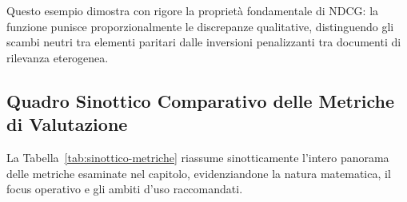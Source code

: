 Questo esempio dimostra con rigore la propriet\`a fondamentale di NDCG: la funzione punisce proporzionalmente le discrepanze qualitative, distinguendo gli scambi neutri tra elementi paritari dalle inversioni penalizzanti tra documenti di rilevanza eterogenea.

\FloatBarrier
\subsection{Quadro Sinottico Comparativo delle Metriche di Valutazione}
\label{subsec:quadro-sinottico-metriche}

La Tabella~\ref{tab:sinottico-metriche} riassume sinotticamente l'intero panorama delle metriche esaminate nel capitolo, evidenziandone la natura matematica, il focus operativo e gli ambiti d'uso raccomandati.


